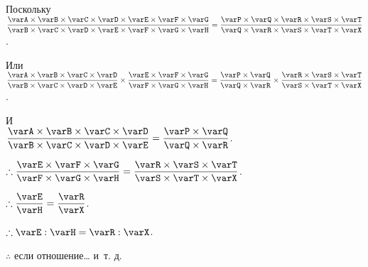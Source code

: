 \documentclass[letters,booklanguage=russian]{byrnebook}
\begin{document}
\begin{center}
Поскольку\\
$\dfrac
{\varA \times \varB \times \varC \times \varD \times \varE \times \varF \times \varG}
{\varB \times \varC \times \varD \times \varE \times \varF \times \varG \times \varH} =
\dfrac
{\varP \times \varQ \times \varR \times \varS \times \varT}
{\varQ \times \varR \times \varS \times \varT \times \varX}$.

Или\\
$\dfrac
{\varA \times \varB \times \varC \times \varD}
{\varB \times \varC \times \varD \times \varE}
\times
\dfrac
{\varE \times \varF \times \varG}
{\varF \times \varG \times \varH} =
\dfrac
{\varP \times \varQ}
{\varQ \times \varR}
\times
\dfrac
{\varR \times \varS \times \varT}
{\varS \times \varT \times \varX}$.

И\\
$\dfrac
{\varA \times \varB \times \varC \times \varD}
{\varB \times \varC \times \varD \times \varE} =
\dfrac
{\varP \times \varQ}
{\varQ \times \varR}$.

$\therefore \dfrac
{\varE \times \varF \times \varG}
{\varF \times \varG \times \varH} =
\dfrac
{\varR \times \varS \times \varT}
{\varS \times \varT \times \varX}$.

$\therefore \dfrac{\varE}{\varH} = \dfrac{\varR}{\varX}$.

$\therefore \varE : \varH = \varR : \varX$.

$\therefore$ если отношение… и~т. д.
\end{center}

\vfill\pagebreak
\end{document}
